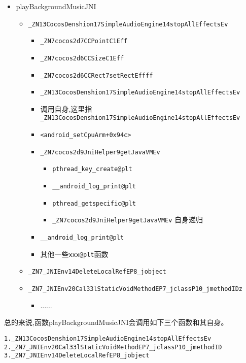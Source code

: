 \begin{itemize}
\item playBackgroundMusicJNI
  	\begin{itemize}
  	\item \verb|_ZN13CocosDenshion17SimpleAudioEngine14stopAllEffectsEv|
		\begin{itemize}
  		\item \verb|_ZN7cocos2d7CCPointC1Eff|
   		\item \verb|_ZN7cocos2d6CCSizeC1Eff|
   		\item \verb|_ZN7cocos2d6CCRect7setRectEffff|
  		\item \verb|_ZN13CocosDenshion17SimpleAudioEngine14stopAllEffectsEv| 
		\item 调用自身,这里指\verb|_ZN13CocosDenshion17SimpleAudioEngine14stopAllEffectsEv|
		\item \verb|<android_setCpuArm+0x94c>|
		\item \verb|_ZN7cocos2d9JniHelper9getJavaVMEv|
  			\begin{itemize}
 			\item \verb|pthread_key_create@plt|
  			\item \verb|__android_log_print@plt|
  			\item \verb|pthread_getspecific@plt|
  			\item \verb|_ZN7cocos2d9JniHelper9getJavaVMEv| 自身递归
  			\end{itemize}
		\item \verb|__android_log_print@plt|
		\item 其他一些\verb|xxx@plt|函数
		\end{itemize}
   	\item \verb|_ZN7_JNIEnv14DeleteLocalRefEP8_jobject|
   	\item \verb|_ZN7_JNIEnv20Cal33lStaticVoidMethodEP7_jclassP10_jmethodIDz|
  		\begin{itemize}
  		\item ......
  		\end{itemize}
	\end{itemize}
\end{itemize}

总的来说,函数playBackgroundMusicJNI会调用如下三个函数和其自身。
\begin{lstlisting}
1._ZN13CocosDenshion17SimpleAudioEngine14stopAllEffectsEv
2._ZN7_JNIEnv20Cal33lStaticVoidMethodEP7_jclassP10_jmethodID
3._ZN7_JNIEnv14DeleteLocalRefEP8_jobject
\end{lstlisting}

